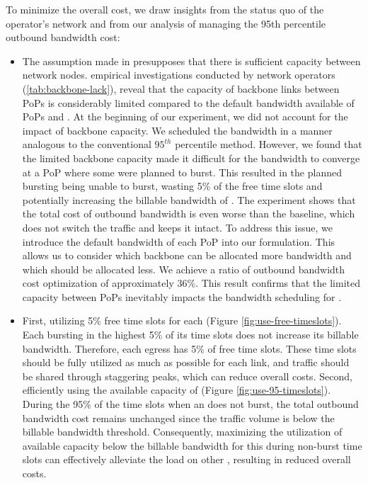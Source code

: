 {To minimize the overall cost, we draw insights from the status quo of the operator's network and from our analysis of managing the 95th percentile outbound bandwidth cost:}
\begin{itemize}
\item{ The assumption made in \cite{singh2021costCascara} presupposes that there is sufficient capacity between network nodes. empirical investigations conducted by network operators (\ref{tab:backbone-lack}), reveal that the capacity of backbone links between PoPs is considerably limited compared to the default bandwidth available of PoPs and {\egresses}. At the beginning of our experiment, we did not account for the impact of backbone capacity. We scheduled the bandwidth in a manner analogous to the conventional $95^{th}$ percentile method. However, we found that the limited backbone capacity made it difficult for the bandwidth to converge at a PoP where some {\egresses} were planned to burst. This resulted in the planned bursting {\egresses} being unable to burst, wasting 5\% of the free time slots and potentially increasing the billable bandwidth of {\egresses}. The experiment shows that the total cost of outbound bandwidth is even worse than the baseline, which does not switch the traffic and keeps it intact. To address this issue, we introduce the default bandwidth of each PoP into our formulation. This allows us to consider which backbone can be allocated more bandwidth and which should be allocated less. We achieve a ratio of outbound bandwidth cost optimization of approximately 36\%. This result confirms that the limited capacity between PoPs inevitably impacts the bandwidth scheduling for {\egresses}}.


\item
{ First, utilizing 5\% free time slots for each {\egress} (Figure \ref{fig:use-free-timeslots}). Each {\egress} bursting in the highest 5\% of its time slots does not increase its billable bandwidth. Therefore, each egress has 5\% of free time slots. These time slots should be fully utilized as much as possible for each link, and traffic should be shared through staggering peaks, which can reduce overall costs. 
Second, efficiently using the available capacity of {\egress} (Figure \ref{fig:use-95-timeslots}). During the 95\% of the time slots when an {\egress} does not burst, the total outbound bandwidth cost remains unchanged since the traffic volume is below the billable bandwidth threshold. Consequently, maximizing the utilization of available capacity below the billable bandwidth for this {\egress} during non-burst time slots can effectively alleviate the load on other {\egresses}, resulting in reduced overall costs.}
\end{itemize}


